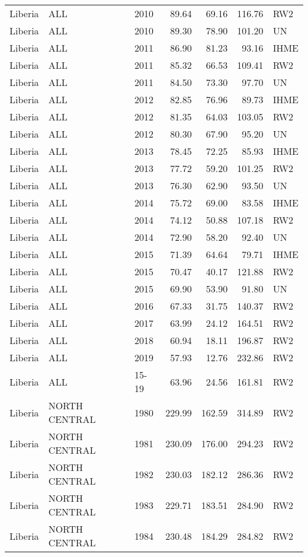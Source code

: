 \begin{longtable}{lllrrrl}
  Liberia & ALL & 2010 & 89.64 & 69.16 & 116.76 & RW2 \\ 
  Liberia & ALL & 2010 & 89.30 & 78.90 & 101.20 & UN \\ 
  Liberia & ALL & 2011 & 86.90 & 81.23 & 93.16 & IHME \\ 
  Liberia & ALL & 2011 & 85.32 & 66.53 & 109.41 & RW2 \\ 
  Liberia & ALL & 2011 & 84.50 & 73.30 & 97.70 & UN \\ 
  Liberia & ALL & 2012 & 82.85 & 76.96 & 89.73 & IHME \\ 
  Liberia & ALL & 2012 & 81.35 & 64.03 & 103.05 & RW2 \\ 
  Liberia & ALL & 2012 & 80.30 & 67.90 & 95.20 & UN \\ 
  Liberia & ALL & 2013 & 78.45 & 72.25 & 85.93 & IHME \\ 
  Liberia & ALL & 2013 & 77.72 & 59.20 & 101.25 & RW2 \\ 
  Liberia & ALL & 2013 & 76.30 & 62.90 & 93.50 & UN \\ 
  Liberia & ALL & 2014 & 75.72 & 69.00 & 83.58 & IHME \\ 
  Liberia & ALL & 2014 & 74.12 & 50.88 & 107.18 & RW2 \\ 
  Liberia & ALL & 2014 & 72.90 & 58.20 & 92.40 & UN \\ 
  Liberia & ALL & 2015 & 71.39 & 64.64 & 79.71 & IHME \\ 
  Liberia & ALL & 2015 & 70.47 & 40.17 & 121.88 & RW2 \\ 
  Liberia & ALL & 2015 & 69.90 & 53.90 & 91.80 & UN \\ 
  Liberia & ALL & 2016 & 67.33 & 31.75 & 140.37 & RW2 \\ 
  Liberia & ALL & 2017 & 63.99 & 24.12 & 164.51 & RW2 \\ 
  Liberia & ALL & 2018 & 60.94 & 18.11 & 196.87 & RW2 \\ 
  Liberia & ALL & 2019 & 57.93 & 12.76 & 232.86 & RW2 \\ 
  Liberia & ALL & 15-19 & 63.96 & 24.56 & 161.81 & RW2 \\ 
  Liberia & NORTH CENTRAL & 1980 & 229.99 & 162.59 & 314.89 & RW2 \\ 
  Liberia & NORTH CENTRAL & 1981 & 230.09 & 176.00 & 294.23 & RW2 \\ 
  Liberia & NORTH CENTRAL & 1982 & 230.03 & 182.12 & 286.36 & RW2 \\ 
  Liberia & NORTH CENTRAL & 1983 & 229.71 & 183.51 & 284.90 & RW2 \\ 
  Liberia & NORTH CENTRAL & 1984 & 230.48 & 184.29 & 284.82 & RW2 \\ 

\end{longtable}
